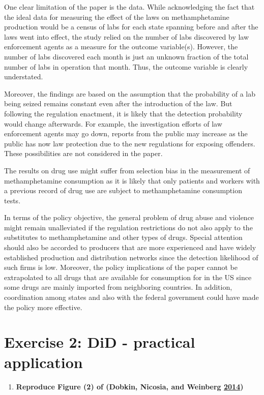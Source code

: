\documentclass[
  11pt,
]{article}
\providecommand{\tightlist}{%
  \setlength{\itemsep}{0pt}\setlength{\parskip}{0pt}}
\begin{document}
One clear limitation of the paper is the data. While acknowledging the
fact that the ideal data for measuring the effect of the laws on
methamphetamine production would be a census of labs for each state
spanning before and after the laws went into effect, the study relied on
the number of labs discovered by law enforcement agents as a measure for
the outcome variable(s). However, the number of labs discovered each
month is just an unknown fraction of the total number of labs in
operation that month. Thus, the outcome variable is clearly understated.

Moreover, the findings are based on the assumption that the probability
of a lab being seized remains constant even after the introduction of
the law. But following the regulation enactment, it is likely that the
detection probability would change afterwards. For example, the
investigation efforts of law enforcement agents may go down, reports
from the public may increase as the public has now law protection due to
the new regulations for exposing offenders. These possibilities are not
considered in the paper.

The results on drug use might suffer from selection bias in the
measurement of methamphetamine consumption as it is likely that only
patients and workers with a previous record of drug use are subject to
methamphetamine consumption tests.

In terms of the policy objective, the general problem of drug abuse and
violence might remain unalleviated if the regulation restrictions do not
also apply to the substitutes to methamphetamine and other types of
drugs. Special attention should also be accorded to producers that are
more experienced and have widely established production and distribution
networks since the detection likelihood of such firms is low. Moreover,
the policy implications of the paper cannot be extrapolated to all drugs
that are available for consumption for in the US since some drugs are
mainly imported from neighboring countries. In addition, coordination
among states and also with the federal government could have made the
policy more effective.

\hypertarget{exercise-2-did---practical-application}{%
\section{Exercise 2: DiD - practical
application}\label{exercise-2-did---practical-application}}

\begin{enumerate}
\def\labelenumi{(\alph{enumi})}
\tightlist
\item
  \textbf{Reproduce Figure (2) of (Dobkin, Nicosia, and Weinberg
  \protect\hyperlink{ref-DOBKIN201448}{2014})}
\end{enumerate}
\end{document}
